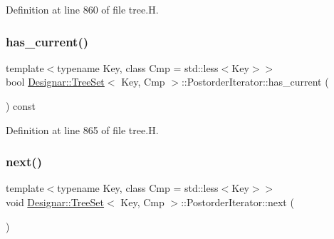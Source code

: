 Definition at line 860 of file tree.\+H.

\mbox{\label{class_designar_1_1_tree_set_1_1_postorder_iterator_a550cba5f162afa8ff251d750b6147f3c}} 
\subsubsection{\texorpdfstring{has\+\_\+current()}{has\_current()}}
{\footnotesize\ttfamily template$<$typename Key, class Cmp = std\+::less$<$\+Key$>$$>$ \\
bool \hyperlink{class_designar_1_1_tree_set}{Designar\+::\+Tree\+Set}$<$ Key, Cmp $>$\+::Postorder\+Iterator\+::has\+\_\+current (\begin{DoxyParamCaption}{ }\end{DoxyParamCaption}) const\hspace{0.3cm}{\ttfamily [inline]}}



Definition at line 865 of file tree.\+H.

\mbox{\label{class_designar_1_1_tree_set_1_1_postorder_iterator_a5dc00bc0f67733886839372bce6870e5}} 
\subsubsection{\texorpdfstring{next()}{next()}}
{\footnotesize\ttfamily template$<$typename Key, class Cmp = std\+::less$<$\+Key$>$$>$ \\
void \hyperlink{class_designar_1_1_tree_set}{Designar\+::\+Tree\+Set}$<$ Key, Cmp $>$\+::Postorder\+Iterator\+::next (\begin{DoxyParamCaption}{ }\end{DoxyParamCaption})\hspace{0.3cm}{\ttfamily [inline]}}



